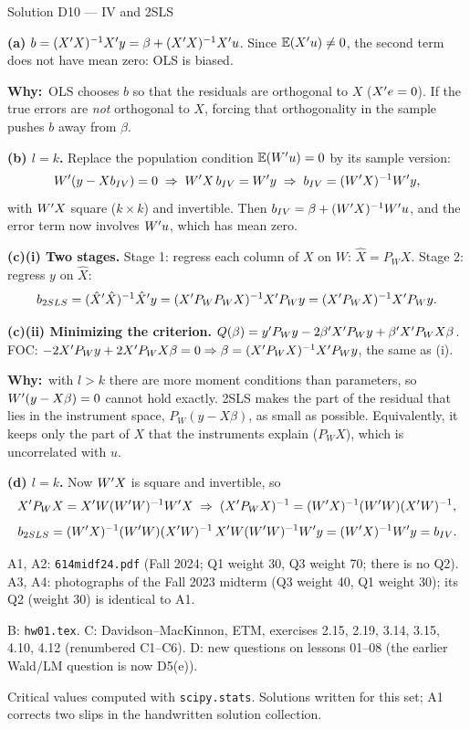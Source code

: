 \documentclass[11pt]{article}
\newcommand{\step}[1]{\par\smallskip\noindent\textbf{\textcolor{qnavy}{#1}}\quad\ignorespaces}
\newcommand{\Why}{\textbf{\textcolor{whyline}{Why:}}\ }
\begin{document}
\begin{solbox}{Solution D10 --- IV and 2SLS}
\step{(a)} $b = (X^{\prime} X)^{-1}X^{\prime} y = \beta + (X^{\prime} X)^{-1}X^{\prime} u$. Since $\mathbb{E}(X^{\prime} u) \neq 0$, the second
term does not have mean zero: OLS is biased.
\begin{why}\Why OLS chooses $b$ so that the residuals are orthogonal to $X$ ($X^{\prime} e = 0$). If
the true errors are \emph{not} orthogonal to $X$, forcing that orthogonality in the sample
pushes $b$ away from $\beta$.\end{why}
\step{(b) $l = k$.} Replace the population condition $\mathbb{E}(W^{\prime} u) = 0$ by its sample version:
\[
  W^{\prime}(y - Xb_{IV}) = 0 \;\Rightarrow\; W^{\prime} X\,b_{IV} = W^{\prime} y \;\Rightarrow\; b_{IV} = (W^{\prime} X)^{-1}W^{\prime} y,
\]
with $W^{\prime} X$ square ($k \times k$) and invertible. Then $b_{IV} = \beta + (W^{\prime} X)^{-1}W^{\prime} u$, and the
error term now involves $W^{\prime} u$, which has mean zero.
\step{(c)(i) Two stages.} Stage 1: regress each column of $X$ on $W$: $\hat X = P_{W}X$.
Stage 2: regress $y$ on $\hat X$:
\[
  b_{2SLS} = (\hat X^{\prime}\hat X)^{-1}\hat X^{\prime} y = (X^{\prime} P_{W}P_{W}X)^{-1}X^{\prime} P_{W}y = (X^{\prime} P_{W}X)^{-1}X^{\prime} P_{W}y .
\]
\step{(c)(ii) Minimizing the criterion.}
$Q(\beta) = y^{\prime} P_{W}y - 2\beta^{\prime} X^{\prime} P_{W}y + \beta^{\prime} X^{\prime} P_{W}X\beta$. FOC:
$-2X^{\prime} P_{W}y + 2X^{\prime} P_{W}X\beta = 0 \Rightarrow \beta = (X^{\prime} P_{W}X)^{-1}X^{\prime} P_{W}y$, the same as (i).
\begin{why}\Why with $l > k$ there are more moment conditions than parameters, so
$W^{\prime}(y - X\beta) = 0$ cannot hold exactly. 2SLS makes the part of the residual that lies in
the instrument space, $P_{W}(y - X\beta)$, as small as possible. Equivalently, it keeps only
the part of $X$ that the instruments explain ($P_{W}X$), which is uncorrelated with $u$.\end{why}
\step{(d) $l = k$.} Now $W^{\prime} X$ is square and invertible, so
\[
  X^{\prime} P_{W}X = X^{\prime} W(W^{\prime} W)^{-1}W^{\prime} X \;\Rightarrow\;
  (X^{\prime} P_{W}X)^{-1} = (W^{\prime} X)^{-1}(W^{\prime} W)(X^{\prime} W)^{-1},
\]
\[
  b_{2SLS} = (W^{\prime} X)^{-1}(W^{\prime} W)(X^{\prime} W)^{-1}\,X^{\prime} W(W^{\prime} W)^{-1}W^{\prime} y = (W^{\prime} X)^{-1}W^{\prime} y = b_{IV}.
\]
\end{solbox}

\begin{transcriptnotes}
  \item A1, A2: \texttt{614midf24.pdf} (Fall 2024; Q1 weight 30, Q3 weight 70; there is no Q2).
        A3, A4: photographs of the Fall 2023 midterm (Q3 weight 40, Q1 weight 30); its Q2
        (weight 30) is identical to A1.
  \item B: \texttt{hw01.tex}. C: Davidson--MacKinnon, ETM, exercises 2.15, 2.19, 3.14, 3.15, 4.10, 4.12
        (renumbered C1--C6). D: new questions on lessons 01--08 (the earlier Wald/LM question is now D5(e)).
  \item Critical values computed with \texttt{scipy.stats}. Solutions written for this set;
        A1 corrects two slips in the handwritten solution collection.
\end{transcriptnotes}
\end{document}
